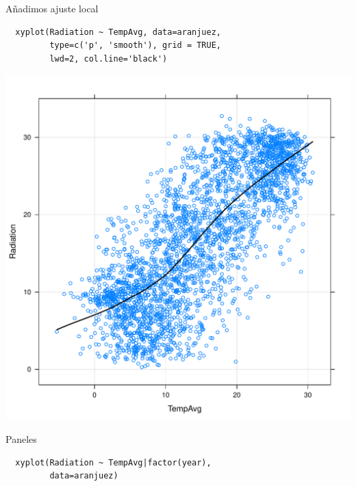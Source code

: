 \documentclass[xcolor={usenames,svgnames,dvipsnames}]{beamer}
\begin{document}
\begin{frame}[fragile,label=sec-2-1-8]{Añadimos ajuste local}
 \lstset{language=R,label= ,caption= ,numbers=none}
\begin{lstlisting}
  xyplot(Radiation ~ TempAvg, data=aranjuez,
         type=c('p', 'smooth'), grid = TRUE,
         lwd=2, col.line='black')
\end{lstlisting}
\end{frame}

\begin{frame}[label=sec-2-1-9]{}
\includegraphics[width=.9\linewidth]{figs/xyplotSmooth.pdf}
\end{frame}


\begin{frame}[fragile,label=sec-2-1-10]{Paneles}
 \lstset{language=R,label= ,caption= ,numbers=none}
\begin{lstlisting}
  xyplot(Radiation ~ TempAvg|factor(year),
         data=aranjuez)
\end{lstlisting}
\end{frame}
\end{document}
